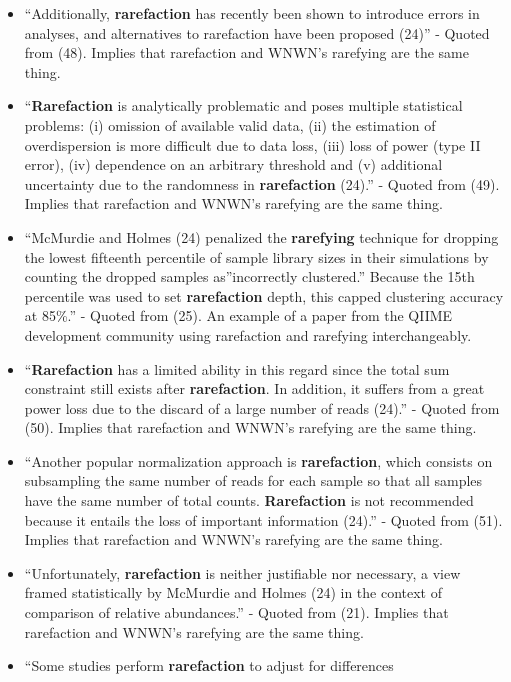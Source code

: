\documentclass[
]{article}
\begin{document}
\begin{itemize}
\item
  ``Additionally, \textbf{rarefaction} has recently been shown to
  introduce errors in analyses, and alternatives to rarefaction have
  been proposed (24)'' - Quoted from (48). Implies that rarefaction and
  WNWN's rarefying are the same thing.
\item
  ``\textbf{Rarefaction} is analytically problematic and poses multiple
  statistical problems: (i) omission of available valid data, (ii) the
  estimation of overdispersion is more difficult due to data loss, (iii)
  loss of power (type II error), (iv) dependence on an arbitrary
  threshold and (v) additional uncertainty due to the randomness in
  \textbf{rarefaction} (24).'' - Quoted from (49). Implies that
  rarefaction and WNWN's rarefying are the same thing.
\item
  ``McMurdie and Holmes (24) penalized the \textbf{rarefying} technique
  for dropping the lowest fifteenth percentile of sample library sizes
  in their simulations by counting the dropped samples as''incorrectly
  clustered.'' Because the 15th percentile was used to set
  \textbf{rarefaction} depth, this capped clustering accuracy at 85\%.''
  - Quoted from (25). An example of a paper from the QIIME development
  community using rarefaction and rarefying interchangeably.
\item
  ``\textbf{Rarefaction} has a limited ability in this regard since the
  total sum constraint still exists after \textbf{rarefaction}. In
  addition, it suffers from a great power loss due to the discard of a
  large number of reads (24).'' - Quoted from (50). Implies that
  rarefaction and WNWN's rarefying are the same thing.
\item
  ``Another popular normalization approach is \textbf{rarefaction},
  which consists on subsampling the same number of reads for each sample
  so that all samples have the same number of total counts.
  \textbf{Rarefaction} is not recommended because it entails the loss of
  important information (24).'' - Quoted from (51). Implies that
  rarefaction and WNWN's rarefying are the same thing.
\item
  ``Unfortunately, \textbf{rarefaction} is neither justifiable nor
  necessary, a view framed statistically by McMurdie and Holmes (24) in
  the context of comparison of relative abundances.'' - Quoted from
  (21). Implies that rarefaction and WNWN's rarefying are the same
  thing.
\item
  ``Some studies perform \textbf{rarefaction} to adjust for differences

\end{itemize}
\end{document}

